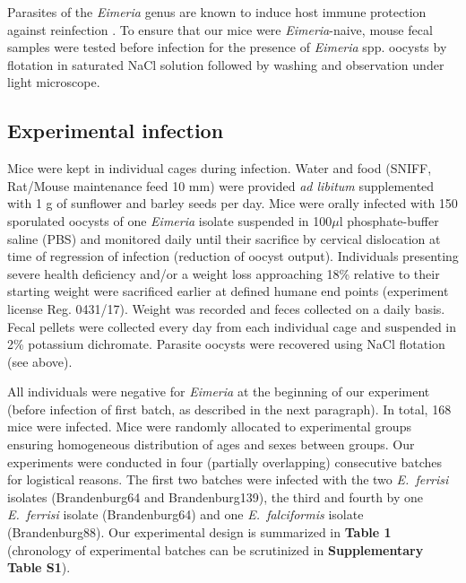 \documentclass[12pt]{article}
\begin{document}
Parasites of the \textit{Eimeria }genus are known to induce host immune protection against reinfection \citep{rose_immune_1992, smith_genetic_2000}. To ensure that our mice were \textit{Eimeria}-naive, mouse fecal samples were tested before infection for the presence of \textit{Eimeria }spp. oocysts by flotation in saturated NaCl solution followed by washing and observation under light microscope. \par

\subsection{Experimental infection}

Mice were kept in individual cages during infection. Water and food (SNIFF, Rat/Mouse maintenance feed 10 mm) were provided \textit{ad libitum} supplemented with 1 g of sunflower and barley seeds per day. Mice were orally infected with 150 sporulated oocysts of one \textit{Eimeria }isolate suspended in 100$\mu$l phosphate-buffer saline (PBS) and monitored daily until their sacrifice by cervical dislocation at time of regression of infection (reduction of oocyst output). Individuals presenting severe health deficiency and/or a weight loss approaching 18\% relative to their starting weight were sacrificed earlier at defined humane end points (experiment license Reg. 0431/17). Weight was recorded and feces collected on a daily basis. Fecal pellets were collected every day from each individual cage and suspended in 2\% potassium dichromate. Parasite oocysts were recovered using NaCl flotation (see above). \par

All individuals were negative for \textit{Eimeria }at the beginning of our experiment (before infection of first batch, as described in the next paragraph). In total, 168 mice were infected. Mice were randomly allocated to experimental groups ensuring homogeneous distribution of ages and sexes between groups. Our experiments were conducted in four (partially overlapping) consecutive batches for logistical reasons. The first two batches were infected with the two \textit{E.~ferrisi }isolates (Brandenburg64 and Brandenburg139), the third and fourth by one \textit{E.~ferrisi }isolate (Brandenburg64) and one \textit{E.~falciformis }isolate (Brandenburg88). Our experimental design is summarized in \textbf{Table 1} (chronology of experimental batches can be scrutinized in \textbf{Supplementary Table S1}). \par
\end{document}
